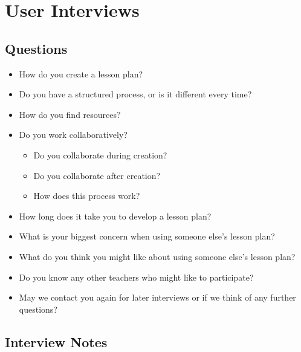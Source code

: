 \documentclass[10pt,letter]{article}
\begin{document}
\pagebreak
\appendix

\section{User Interviews}
\subsection{Questions}
\label{interview questions}
\begin{itemize}
	\item How do you create a lesson plan?

	\item Do you have a structured process, or is it different every time?

	\item How do you find resources?

	\item Do you work collaboratively?
	\begin{itemize}
		\item Do you collaborate during creation?

		\item Do you collaborate after creation?

		\item How does this process work?
	\end{itemize}

	\item How long does it take you to develop a lesson plan?

	\item What is your biggest concern when using someone else's lesson plan?

	\item What do you think you might like about using someone else's lesson
		plan?

	\item Do you know any other teachers who might like to participate?

	\item May we contact you again for later interviews or if we think of any
		further questions?
\end{itemize}

\subsection{Interview Notes}
\begingroup
\let\section\subsubsection
\label{interview notes}

\endgroup
\end{document}
